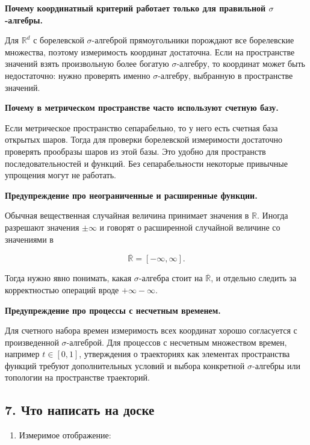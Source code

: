 \documentclass[
  11pt,
  a4paper,
]{article}
\providecommand{\tightlist}{%
  \setlength{\itemsep}{0pt}\setlength{\parskip}{0pt}}
\begin{document}
\textbf{Почему координатный критерий работает только для правильной
\(\sigma\)-алгебры.}

Для \(\mathbb R^d\) с борелевской \(\sigma\)-алгеброй прямоугольники
порождают все борелевские множества, поэтому измеримость координат
достаточна. Если на пространстве значений взять произвольную более
богатую \(\sigma\)-алгебру, то координат может быть недостаточно: нужно
проверять именно \(\sigma\)-алгебру, выбранную в пространстве значений.

\textbf{Почему в метрическом пространстве часто используют счетную
базу.}

Если метрическое пространство сепарабельно, то у него есть счетная база
открытых шаров. Тогда для проверки борелевской измеримости достаточно
проверять прообразы шаров из этой базы. Это удобно для пространств
последовательностей и функций. Без сепарабельности некоторые привычные
упрощения могут не работать.

\textbf{Предупреждение про неограниченные и расширенные функции.}

Обычная вещественная случайная величина принимает значения в
\(\mathbb R\). Иногда разрешают значения \(\pm\infty\) и говорят о
расширенной случайной величине со значениями в

\[
\overline{\mathbb R}=[-\infty,\infty].
\]

Тогда нужно явно понимать, какая \(\sigma\)-алгебра стоит на
\(\overline{\mathbb R}\), и отдельно следить за корректностью операций
вроде \(+\infty-\infty\).

\textbf{Предупреждение про процессы с несчетным временем.}

Для счетного набора времен измеримость всех координат хорошо согласуется
с произведенной \(\sigma\)-алгеброй. Для процессов с несчетным
множеством времен, например \(t\in[0,1]\), утверждения о траекториях как
элементах пространства функций требуют дополнительных условий и выбора
конкретной \(\sigma\)-алгебры или топологии на пространстве траекторий.

\subsection{7. Что написать на
доске}\label{ux447ux442ux43e-ux43dux430ux43fux438ux441ux430ux442ux44c-ux43dux430-ux434ux43eux441ux43aux435}

\begin{enumerate}
\def\labelenumi{\arabic{enumi}.}
\tightlist
\item
  Измеримое отображение:
\end{enumerate}
\end{document}
